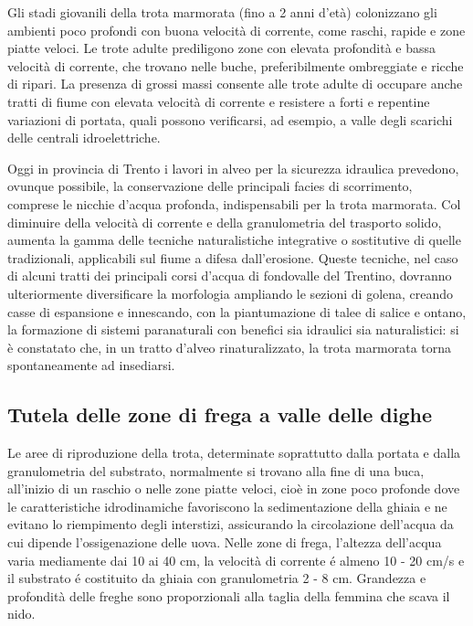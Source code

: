 \documentclass[10pt,twoside,openany,x11names,svgnames,italian,a5paper,dvipsnames,table]{memoir}
\begin{document}
Gli stadi giovanili della trota marmorata (fino a 2 anni d'età) colonizzano gli ambienti poco profondi con buona velocità di corrente, come raschi, rapide e zone piatte veloci. Le trote adulte prediligono zone con elevata profondità e bassa velocità di corrente, che trovano nelle buche, preferibilmente ombreggiate e ricche di ripari. La presenza di grossi massi consente alle trote adulte di occupare anche tratti di fiume con elevata velocità di corrente e resistere a forti e repentine variazioni di portata, quali possono verificarsi, ad esempio, a valle degli scarichi delle centrali idroelettriche.

Oggi in provincia di Trento i lavori in alveo per la sicurezza idraulica prevedono, ovunque possibile, la conservazione delle principali facies di scorrimento, comprese le nicchie d’acqua profonda, indispensabili per la trota marmorata. Col diminuire della velocità di corrente e della granulometria del trasporto solido, aumenta la gamma delle tecniche naturalistiche integrative o sostitutive di quelle tradizionali, applicabili sul fiume a difesa dall’erosione. Queste tecniche, nel caso di alcuni tratti dei principali corsi d’acqua di fondovalle del Trentino, dovranno ulteriormente diversificare la morfologia ampliando le sezioni di golena, creando casse di espansione e innescando, con la piantumazione di talee di salice e ontano, la formazione di sistemi paranaturali con benefici sia idraulici sia naturalistici: si è constatato che, in un tratto d’alveo rinaturalizzato, la trota marmorata torna spontaneamente ad insediarsi.

\newpage
\subsection{Tutela delle zone di frega a valle delle dighe}
Le aree di riproduzione della trota, determinate soprattutto dalla portata e dalla granulometria del substrato, normalmente si trovano alla fine di una buca, all'inizio di un raschio o nelle zone piatte veloci, cioè in zone poco profonde dove le caratteristiche idrodinamiche favoriscono la sedimentazione della ghiaia e ne evitano lo riempimento degli interstizi, assicurando la circolazione dell'acqua da cui dipende l'ossigenazione delle uova. Nelle zone di frega, l'altezza dell'acqua varia mediamente dai 10 ai 40 cm, la velocità di corrente é almeno 10 - 20 cm/s e il substrato é costituito da ghiaia con granulometria 2 - 8 cm. Grandezza e profondità delle freghe sono proporzionali alla taglia della femmina che scava il nido.
\end{document}
